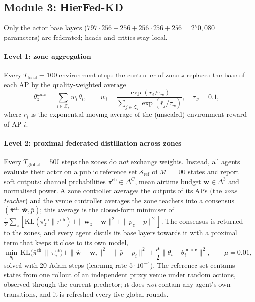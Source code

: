 \subsection{Module 3: HierFed-KD}
\label{sec:hierfed}

Only the actor base layers ($797\!\cdot\!256+256+256\!\cdot\!256+256=270{,}080$ parameters) are federated; heads and critics stay local.

\paragraph{Level 1: zone aggregation} Every $T_{\mathrm{local}}=100$ environment steps the controller of zone $z$ replaces the base of each AP by the quality-weighted average
\begin{equation}
  \theta^{\mathrm{zone}}_z=\sum_{i\in\mathcal{Z}_z}w_i\,\theta_i,\qquad w_i=\frac{\exp(\bar r_i/\tau_w)}{\sum_{j\in\mathcal{Z}_z}\exp(\bar r_j/\tau_w)},\quad\tau_w=0.1,
  \label{eq:zone}
\end{equation}
where $\bar r_i$ is the exponential moving average of the (unscaled) environment reward of AP $i$.

\paragraph{Level 2: proximal federated distillation across zones} Every $T_{\mathrm{global}}=500$ steps the zones do \emph{not} exchange weights. Instead, all agents evaluate their actor on a public reference set $\mathcal{S}_{\mathrm{ref}}$ of $M=100$ states and report soft outputs: channel probabilities $\pi^{\mathrm{ch}}\in\Delta^{C}$, mean airtime budget $\mathbf{w}\in\Delta^3$ and normalised power. A zone controller averages the outputs of its APs (the \emph{zone teacher}) and the venue controller averages the zone teachers into a consensus $(\bar\pi^{\mathrm{ch}},\bar{\mathbf{w}},\bar p)$; this average is the closed-form minimiser of $\frac1Z\sum_z[\mathrm{KL}(\pi^{\mathrm{ch}}_z\|\pi^{\mathrm{ch}})+\|\mathbf{w}_z-\mathbf{w}\|^2+\|p_z-p\|^2]$. The consensus is returned to the zones, and every agent distils its base layers towards it with a proximal term that keeps it close to its own model,
\begin{equation}
  \min_{\theta_i}\ \mathrm{KL}\big(\bar\pi^{\mathrm{ch}}\,\|\,\pi_i^{\mathrm{ch}}\big)+\|\bar{\mathbf{w}}-\mathbf{w}_i\|^2+\|\bar p-p_i\|^2+\frac{\mu}{2}\|\theta_i-\theta_i^{\mathrm{before}}\|^2,\qquad\mu=0.01,
  \label{eq:kd}
\end{equation}
solved with 20 Adam steps (learning rate $5\cdot10^{-4}$). The reference set contains states from one rollout of an independent proxy venue under random actions, observed through the current predictor; it does \emph{not} contain any agent's own transitions, and it is refreshed every five global rounds.

